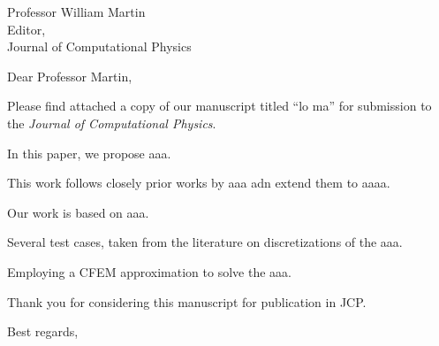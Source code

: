 
        \addtolength{\topmargin}{-1.5cm}    %
       \addtolength{\textheight}{7cm}    %

\address{Jean Ragusa\\ 
Department of Nuclear Engineering \\
Texas A\&M University\\
College Station, TX 77843-3133, USA\\
phone: (979) 862 2033\\
e-mail: jean.ragusa@tamu.edu \vspace{0.5cm}}


\signature{\vspace{-1.25cm}Marc Delchini, Jean Ragusa, Ray Berry}   




\begin{letter}{Professor William Martin\\
    Editor,\\
    Journal of Computational Physics}
\date{\today}

\opening{Dear Professor Martin,}
         \vspace{0.25cm}

Please find attached a copy of our manuscript titled ``lo ma'' for submission to the {\em Journal of Computational Physics}. 

In this paper, we propose  aaa. 


This work follows closely prior works by aaa adn extend them to aaaa.

Our work is based on aaa.

Several test cases, taken from the literature on discretizations of the aaa.

Employing a CFEM approximation to solve the aaa.



Thank you for considering this manuscript for publication in JCP.

\vspace{0.25cm}



\closing{Best regards, }

\end{letter}


